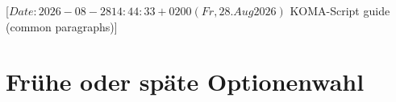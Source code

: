 %
%
%
%
%
%
%

                 [$Date: 2026-08-28 14:44:33 +0200 (Fr, 28. Aug 2026) $
                  KOMA-Script guide (common paragraphs)]

\section{Frühe oder späte Optionenwahl}
\BeginIndexGroup
{}%


